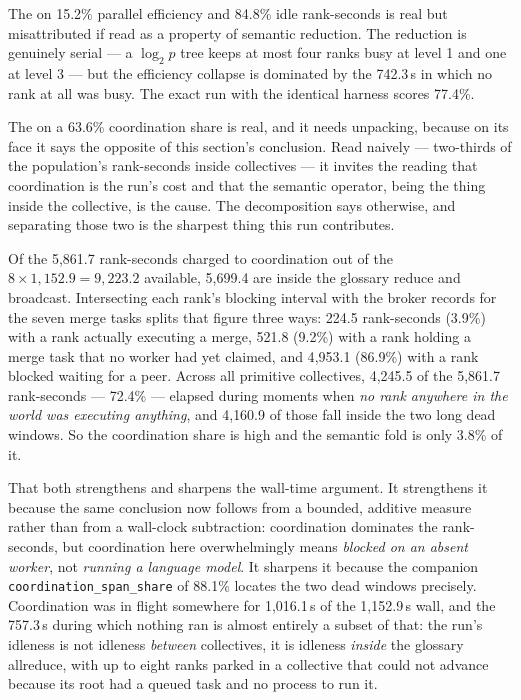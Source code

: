 \documentclass[11pt]{article}
\begin{document}
The  on 15.2\% parallel efficiency and 84.8\% idle rank-seconds is real but
misattributed if read as a property of semantic reduction. The reduction is genuinely serial ---
a $\log_2 p$ tree keeps at most four ranks busy at level 1 and one at level 3 --- but the
efficiency collapse is dominated by the 742.3\,s in which no rank at all was busy. The exact run
with the identical harness scores 77.4\%.

The  on a 63.6\% coordination share is real, and it needs unpacking, because on its
face it says the opposite of this section's conclusion. Read naively --- two-thirds of the
population's rank-seconds inside collectives --- it invites the reading that coordination is the
run's cost and that the semantic operator, being the thing inside the collective, is the cause.
The decomposition says otherwise, and separating those two is the sharpest thing this run
contributes.

Of the 5{,}861.7 rank-seconds charged to coordination out of the $8\times1{,}152.9=9{,}223.2$
available, 5{,}699.4 are inside the glossary reduce and broadcast. Intersecting each rank's
blocking interval with the broker records for the seven merge tasks splits that figure three
ways: 224.5 rank-seconds (3.9\%) with a rank actually executing a merge, 521.8 (9.2\%) with a
rank holding a merge task that no worker had yet claimed, and 4{,}953.1 (86.9\%) with a rank
blocked waiting for a peer. Across all primitive collectives, 4{,}245.5 of the 5{,}861.7
rank-seconds --- 72.4\% --- elapsed during moments when \emph{no rank anywhere in the world was
executing anything}, and 4{,}160.9 of those fall inside the two long dead windows. So the
coordination share is high and the semantic fold is only 3.8\% of it.

That both strengthens and sharpens the wall-time argument. It strengthens it because the same
conclusion now follows from a bounded, additive measure rather than from a wall-clock subtraction:
coordination dominates the rank-seconds, but coordination here overwhelmingly means \emph{blocked
on an absent worker}, not \emph{running a language model}. It sharpens it because the companion
\texttt{coordination\_span\_share} of 88.1\% locates the two dead windows precisely. Coordination
was in flight somewhere for 1{,}016.1\,s of the 1{,}152.9\,s wall, and the 757.3\,s during which
nothing ran is almost entirely a subset of that: the run's idleness is not idleness \emph{between}
collectives, it is idleness \emph{inside} the glossary allreduce, with up to eight ranks parked in
a collective that could not advance because its root had a queued task and no process to run it.
\end{document}
